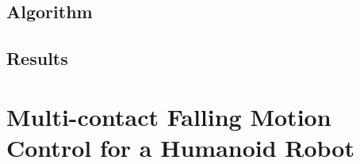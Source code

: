 \subsection{Algorithm}

\subsection{Results}

\section{Multi-contact Falling Motion Control for a Humanoid Robot}
